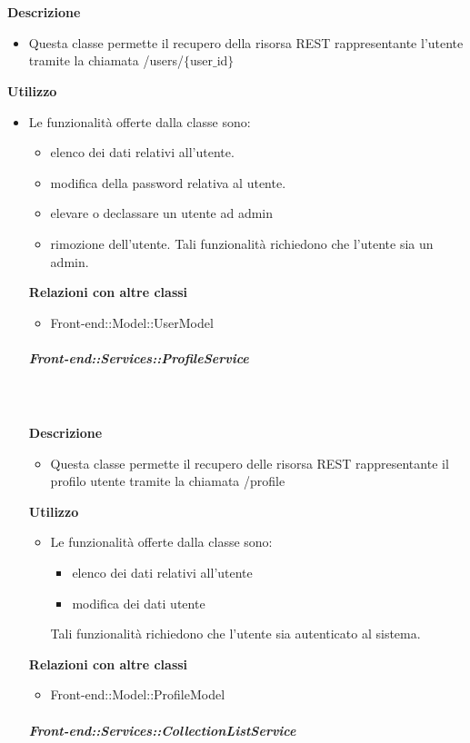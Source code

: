         \textbf{\\ \\ Descrizione} 
          \begin{itemize}
            \item[] Questa classe permette il recupero della risorsa REST rappresentante l'utente tramite la chiamata /users/$\{$user$\_$id$\}$
          \end{itemize}      
        \textbf{Utilizzo}  
          \begin{itemize}
            \item[] Le funzionalità offerte dalla classe sono: 
\begin{itemize} 
\item elenco dei dati relativi all'utente. 
\item modifica della password relativa al utente.
\item elevare o declassare un utente ad admin 
\item rimozione dell'utente. 
Tali funzionalità richiedono che l'utente sia un admin.
          \end{itemize}
          \textbf{Relazioni con altre classi}
          \begin{itemize}
              \item{Front-end::Model::UserModel}
          \end{itemize}
      \subparagraph{Front-end::Services::ProfileService}
        
        \textbf{\\ \\ Descrizione} 
          \begin{itemize}
            \item[] Questa classe permette il recupero delle risorsa REST rappresentante il profilo utente tramite la chiamata /profile
          \end{itemize}      
        \textbf{Utilizzo}  
          \begin{itemize}
            \item[] Le funzionalità offerte dalla classe sono:
\begin{itemize}
\item elenco dei dati relativi all'utente
\item modifica dei dati utente
\end{itemize}

Tali funzionalità richiedono che l'utente sia autenticato al sistema.
          \end{itemize}
          \textbf{Relazioni con altre classi}
          \begin{itemize}
              \item{Front-end::Model::ProfileModel}
          \end{itemize}
      \subparagraph{Front-end::Services::CollectionListService}
        

\end{itemize}
